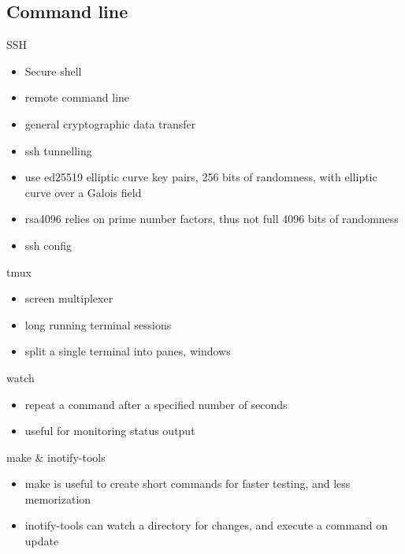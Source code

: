 \documentclass{beamer}
\begin{document}
\subsection{Command line}

\begin{frame}{SSH}
  \begin{itemize}
    \item Secure shell
    \item remote command line
    \item general cryptographic data transfer
    \item ssh tunnelling
    \item use ed25519 elliptic curve key pairs, 256 bits of randomness, with
      elliptic curve over a Galois field
    \item rsa4096 relies on prime number factors, thus not full 4096 bits of
      randomness
    \item ssh config
  \end{itemize}
\end{frame}

\begin{frame}{tmux}
  \begin{itemize}
    \item screen multiplexer
    \item long running terminal sessions
    \item split a single terminal into panes, windows
  \end{itemize}
\end{frame}

\begin{frame}{watch}
  \begin{itemize}
    \item repeat a command after a specified number of seconds
    \item useful for monitoring status output
  \end{itemize}
\end{frame}

\begin{frame}{make \& inotify-tools}
  \begin{itemize}
    \item make is useful to create short commands for faster testing, and less
      memorization
    \item inotify-tools can watch a directory for changes, and execute a
      command on update
  \end{itemize}
\end{frame}
\end{document}
